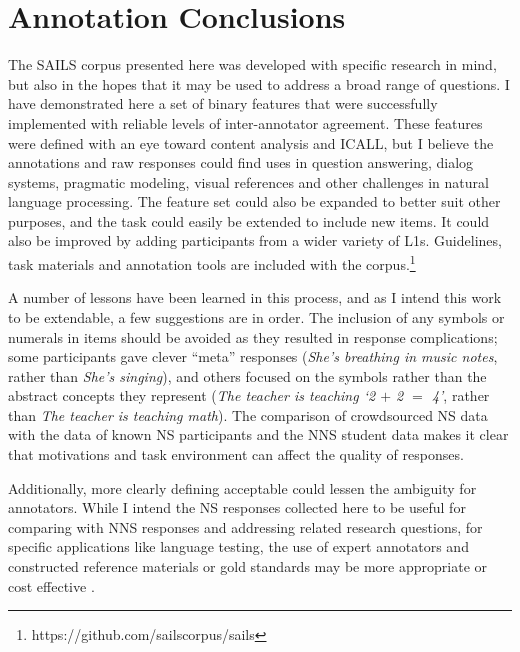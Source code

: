 \section{Annotation Conclusions}

The SAILS corpus presented here was developed with specific research in mind, but also in the hopes that it may be used to address a broad range of questions. I have demonstrated here a set of binary features that were successfully implemented with reliable levels of inter-annotator agreement. These features were defined with an eye toward content analysis and ICALL, but I believe the annotations and raw responses could find uses in question answering, dialog systems, pragmatic modeling, visual references and other challenges in natural language processing. The feature set could also be expanded to better suit other purposes, and the task could easily be extended to include new items. It could also be improved by adding participants from a wider variety of L1s. Guidelines, task materials and annotation tools are included with the corpus.\footnote{https://github.com/sailscorpus/sails}

A number of lessons have been learned in this process, and as I intend this work to be extendable, a few suggestions are in order. The inclusion of any symbols or numerals in items should be avoided as they resulted in response complications; some participants gave clever ``meta'' responses (\textit{She's breathing in music notes}, rather than \textit{She's singing}), and others focused on the symbols rather than the abstract concepts they represent (\textit{The teacher is teaching `2 $+$ 2 $=$ 4'}, rather than \textit{The teacher is teaching math}). The comparison of crowdsourced NS data with the data of known NS participants and the NNS student data makes it clear that motivations and task environment can affect the quality of responses.

Additionally, more clearly defining acceptable  could lessen the ambiguity for annotators. While I intend the NS responses collected here to be useful for comparing with NNS responses and addressing related research questions, for specific applications like language testing, the use of expert annotators and constructed reference materials or gold standards may be more appropriate or cost effective \citep{somasundaran:chodorow:14}.
